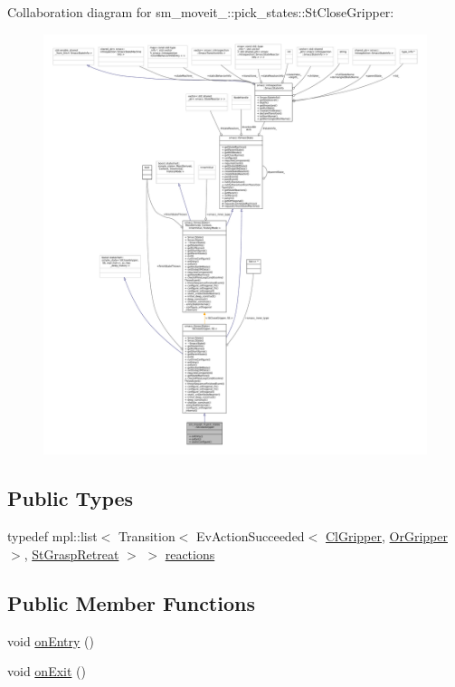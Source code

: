 Collaboration diagram for sm\+\_\+moveit\+\_\+:\+:pick\+\_\+states\+:\+:St\+Close\+Gripper\+:
\nopagebreak
\begin{figure}[H]
\begin{center}
\leavevmode
\includegraphics[width=350pt]{structsm__moveit__4_1_1pick__states_1_1StCloseGripper__coll__graph}
\end{center}
\end{figure}
\subsection*{Public Types}
\begin{DoxyCompactItemize}
\item 
typedef mpl\+::list$<$ Transition$<$ Ev\+Action\+Succeeded$<$ \hyperlink{classsm__moveit__4_1_1cl__gripper_1_1ClGripper}{Cl\+Gripper}, \hyperlink{classsm__moveit__4_1_1OrGripper}{Or\+Gripper} $>$, \hyperlink{structsm__moveit__4_1_1pick__states_1_1StGraspRetreat}{St\+Grasp\+Retreat} $>$ $>$ \hyperlink{structsm__moveit__4_1_1pick__states_1_1StCloseGripper_a6934886ed914236301c2341e96264729}{reactions}
\end{DoxyCompactItemize}
\subsection*{Public Member Functions}
\begin{DoxyCompactItemize}
\item 
void \hyperlink{structsm__moveit__4_1_1pick__states_1_1StCloseGripper_a8d208da87aa5bc3758b3769fe56b5c42}{on\+Entry} ()
\item 
void \hyperlink{structsm__moveit__4_1_1pick__states_1_1StCloseGripper_a427f4aec6a2173899b55e6a45ca28773}{on\+Exit} ()
\end{DoxyCompactItemize}
